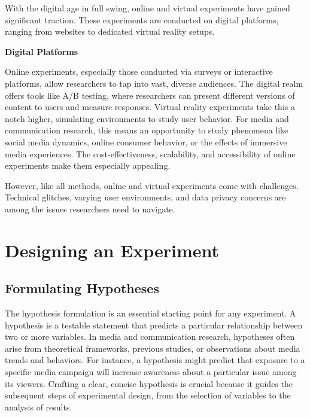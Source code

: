 \documentclass[
  b5paper]{book}
\begin{document}
With the digital age in full swing, online and virtual experiments have gained significant traction. These experiments are conducted on digital platforms, ranging from websites to dedicated virtual reality setups.

\textbf{Digital Platforms}

Online experiments, especially those conducted via surveys or interactive platforms, allow researchers to tap into vast, diverse audiences. The digital realm offers tools like A/B testing, where researchers can present different versions of content to users and measure responses. Virtual reality experiments take this a notch higher, simulating environments to study user behavior. For media and communication research, this means an opportunity to study phenomena like social media dynamics, online consumer behavior, or the effects of immersive media experiences. The cost-effectiveness, scalability, and accessibility of online experiments make them especially appealing.

However, like all methods, online and virtual experiments come with challenges. Technical glitches, varying user environments, and data privacy concerns are among the issues researchers need to navigate.

\hypertarget{designing-an-experiment}{%
\section{Designing an Experiment}\label{designing-an-experiment}}

\hypertarget{formulating-hypotheses}{%
\subsection*{Formulating Hypotheses}\label{formulating-hypotheses}}

The hypothesis formulation is an essential starting point for any experiment. A hypothesis is a testable statement that predicts a particular relationship between two or more variables. In media and communication research, hypotheses often arise from theoretical frameworks, previous studies, or observations about media trends and behaviors. For instance, a hypothesis might predict that exposure to a specific media campaign will increase awareness about a particular issue among its viewers. Crafting a clear, concise hypothesis is crucial because it guides the subsequent steps of experimental design, from the selection of variables to the analysis of results.
\end{document}

